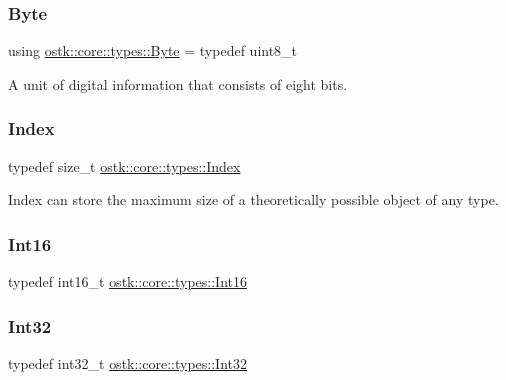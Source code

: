 \subsubsection{\texorpdfstring{Byte}{Byte}}
{\footnotesize\ttfamily using \hyperlink{namespaceostk_1_1core_1_1types_a0733eebee5d093ea04df859028e2649f}{ostk\+::core\+::types\+::\+Byte} = typedef uint8\+\_\+t}



A unit of digital information that consists of eight bits. 

\mbox{\label{namespaceostk_1_1core_1_1types_a6e63c1b15b2e5bc87a43771c09fa913a}} 
\subsubsection{\texorpdfstring{Index}{Index}}
{\footnotesize\ttfamily typedef size\+\_\+t \hyperlink{namespaceostk_1_1core_1_1types_a6e63c1b15b2e5bc87a43771c09fa913a}{ostk\+::core\+::types\+::\+Index}}



Index can store the maximum size of a theoretically possible object of any type. 

\mbox{\label{namespaceostk_1_1core_1_1types_a88d90d717aac6c91b44fd07ec87cf3da}} 
\subsubsection{\texorpdfstring{Int16}{Int16}}
{\footnotesize\ttfamily typedef int16\+\_\+t \hyperlink{namespaceostk_1_1core_1_1types_a88d90d717aac6c91b44fd07ec87cf3da}{ostk\+::core\+::types\+::\+Int16}}

\mbox{\label{namespaceostk_1_1core_1_1types_abc111a0d1129d03945e9bc2e975158ab}} 
\subsubsection{\texorpdfstring{Int32}{Int32}}
{\footnotesize\ttfamily typedef int32\+\_\+t \hyperlink{namespaceostk_1_1core_1_1types_abc111a0d1129d03945e9bc2e975158ab}{ostk\+::core\+::types\+::\+Int32}}

